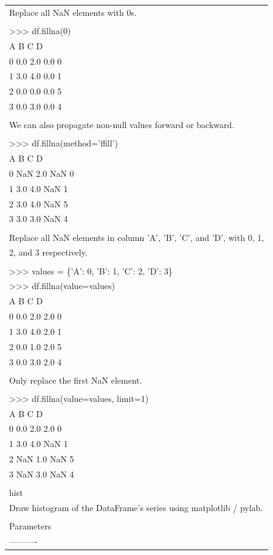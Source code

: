 \documentclass[11pt]{article}
\begin{document}
\begin{enumerate}
\begin{enumerate}
\begin{enumerate}
\begin{center}
\begin{tabular}{l}
Replace all NaN elements with 0s.\\
\\
>>> df.fillna(0)\\
A   B   C   D\\
0   0.0 2.0 0.0 0\\
1   3.0 4.0 0.0 1\\
2   0.0 0.0 0.0 5\\
3   0.0 3.0 0.0 4\\
\\
We can also propagate non-null values forward or backward.\\
\\
>>> df.fillna(method='ffill')\\
A   B   C   D\\
0   NaN 2.0 NaN 0\\
1   3.0 4.0 NaN 1\\
2   3.0 4.0 NaN 5\\
3   3.0 3.0 NaN 4\\
\\
Replace all NaN elements in column 'A', 'B', 'C', and 'D', with 0, 1,\\
2, and 3 respectively.\\
\\
>>> values = \{'A': 0, 'B': 1, 'C': 2, 'D': 3\}\\
>>> df.fillna(value=values)\\
A   B   C   D\\
0   0.0 2.0 2.0 0\\
1   3.0 4.0 2.0 1\\
2   0.0 1.0 2.0 5\\
3   0.0 3.0 2.0 4\\
\\
Only replace the first NaN element.\\
\\
>>> df.fillna(value=values, limit=1)\\
A   B   C   D\\
0   0.0 2.0 2.0 0\\
1   3.0 4.0 NaN 1\\
2   NaN 1.0 NaN 5\\
3   NaN 3.0 NaN 4\\
\\
hist\\
Draw histogram of the DataFrame's series using matplotlib / pylab.\\
\\
Parameters\\
----------\\

\end{tabular}
\end{center}
\end{enumerate}
\end{enumerate}
\end{enumerate}
\end{document}
